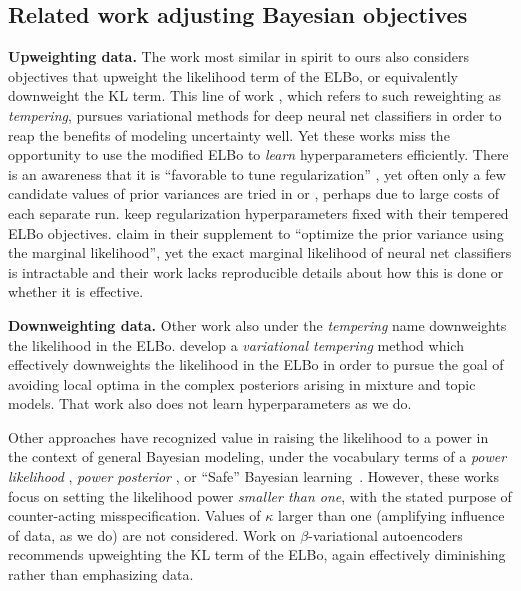 \subsection{Related work adjusting Bayesian objectives}
\label{sec:related_work}

\textbf{Upweighting data.}
The work most similar in spirit to ours also considers objectives that upweight the likelihood term of the ELBo, or equivalently downweight the KL term.
This line of work \citep{pitas2024fine,aitchison2021statistical,osawa2019practical,zhang2018noisy}, which refers to such reweighting as \emph{tempering}, pursues variational methods for deep neural net classifiers in order to reap the benefits of modeling uncertainty well.  Yet these works miss the opportunity to use the modified ELBo to \emph{learn} hyperparameters efficiently. There is an awareness that it is ``favorable to tune regularization'' \citep{zhang2018noisy}, yet often only a few candidate values of prior variances are tried in \citet[Fig. 8]{osawa2019practical} or \citet{zhang2018noisy}, perhaps due to large costs of each separate run.
\citet{aitchison2021statistical} keep regularization hyperparameters fixed with their tempered ELBo objectives. \citet{pitas2024fine} claim in their supplement to ``optimize the prior variance using the marginal
likelihood'', yet the exact marginal likelihood of neural net classifiers is intractable and their work lacks reproducible details about how this is done or whether it is effective.

\textbf{Downweighting data.}
Other work also under the \emph{tempering} name downweights the likelihood in the ELBo.
\citet{mandt2016variational} develop a \emph{variational tempering} method which effectively downweights the likelihood in the ELBo in order to pursue the goal of avoiding local optima in the complex posteriors arising in mixture and topic models. That work also does not learn hyperparameters as we do.

Other approaches have recognized value in raising the likelihood to a power in the context of general Bayesian modeling, under the vocabulary terms of a \emph{power likelihood} \citep{antoniano2013bayesian}, \emph{power posterior} \citep{friel2008marginal,miller2019robust}, or ``Safe'' Bayesian learning~\citep{grunwald2012safe,grunwald2017inconsistency}. 
However, these works focus on setting the likelihood power \emph{smaller than one}, with the stated purpose of counter-acting misspecification. Values of $\kappa$ larger than one (amplifying influence of data, as we do) are not considered. Work on $\beta$-variational autoencoders~\citep{higginsBetaVAE2017} recommends upweighting the KL term of the ELBo, again effectively diminishing rather than emphasizing data.

